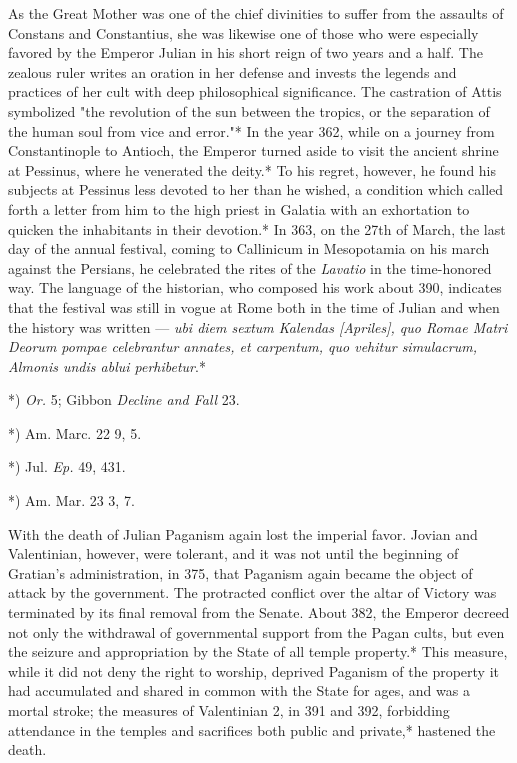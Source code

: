 \documentclass[a4paper, 11pt, oneside, polutonikogreek, english]{article}
\begin{document}
As the Great Mother was one of the chief divinities to suffer from the assaults of Constans and Constantius, she was likewise one of those who were especially favored by the Emperor Julian in his short reign of two years and a half. The zealous ruler writes an oration in her defense and invests the legends and practices of her cult with deep philosophical significance. The castration of Attis symbolized "the revolution of the sun between the tropics, or the separation of the human soul from vice and error."* In the year 362, while on a journey from Constantinople to Antioch, the Emperor turned aside to visit the ancient shrine at Pessinus, where he venerated the deity.* To his regret, however, he found his subjects at Pessinus less devoted to her than he wished, a condition which called forth a letter from him to the high priest in Galatia with an exhortation to quicken the inhabitants in their devotion.* In 363, on the 27th of March, the last day of the annual festival, coming to Callinicum in Mesopotamia on his march against the Persians, he celebrated the rites of the \emph{Lavatio} in the time-honored way. The language of the historian, who composed his work about 390, indicates that the festival was still in vogue at Rome both in the time of Julian and when the history was written --- \emph{ubi diem sextum Kalendas [Apriles], quo Romae Matri Deorum pompae celebrantur annates, et carpentum, quo vehitur simulacrum, Almonis undis ablui perhibetur}.*

*) \emph{Or.} 5; Gibbon \emph{Decline and Fall} 23.

*) Am. Marc. 22 9, 5.

*) Jul. \emph{Ep.} 49, 431.

*) Am. Mar. 23 3, 7.

With the death of Julian Paganism again lost the imperial favor. Jovian and Valentinian, however, were tolerant, and it was not until the beginning of Gratian's administration, in 375, that Paganism again became the object of attack by the government. The protracted conflict over the altar of Victory was terminated by its final removal from the Senate. About 382, the Emperor decreed not only the withdrawal of governmental support from the Pagan cults, but even the seizure and appropriation by the State of all temple property.* This measure, while it did not deny the right to worship, deprived Paganism of the property it had accumulated and shared in common with the State for ages, and was a mortal stroke; the measures of Valentinian 2, in 391 and 392, forbidding attendance in the temples and sacrifices both public and private,* hastened the death.
\end{document}
